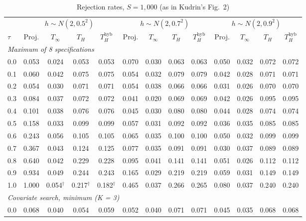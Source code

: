 \begin{table}[htbp]
\centering
\caption{Rejection rates, $S = 1{,}000$ (as in Kudrin's Fig.~2)}
\label{tab:kudrin_style_mean_dial_S1000}
\footnotesize
\setlength{\tabcolsep}{4pt}
\begin{tabular}{lcccccccccccc}
\toprule
 & \multicolumn{4}{c}{$h \sim N(2, 0.5^2)$} & \multicolumn{4}{c}{$h \sim N(2, 0.7^2)$} & \multicolumn{4}{c}{$h \sim N(2, 0.9^2)$} \\
\cmidrule(lr){2-5} \cmidrule(lr){6-9} \cmidrule(lr){10-13}
$\tau$ & Proj. & $T_\infty$ & $T_H$ & $T_H^{\mathrm{hyb}}$ & Proj. & $T_\infty$ & $T_H$ & $T_H^{\mathrm{hyb}}$ & Proj. & $T_\infty$ & $T_H$ & $T_H^{\mathrm{hyb}}$ \\
\midrule
\multicolumn{13}{l}{\textit{Maximum of 8 specifications}} \\
0.0 & 0.053 & 0.024 & 0.053 & 0.053 & 0.070 & 0.030 & 0.063 & 0.063 & 0.050 & 0.032 & 0.072 & 0.072 \\
0.1 & 0.060 & 0.042 & 0.075 & 0.075 & 0.054 & 0.032 & 0.079 & 0.079 & 0.042 & 0.028 & 0.071 & 0.071 \\
0.2 & 0.054 & 0.030 & 0.071 & 0.071 & 0.054 & 0.038 & 0.066 & 0.066 & 0.031 & 0.026 & 0.070 & 0.070 \\
0.3 & 0.084 & 0.037 & 0.072 & 0.072 & 0.041 & 0.020 & 0.069 & 0.069 & 0.042 & 0.026 & 0.095 & 0.095 \\
0.4 & 0.101 & 0.038 & 0.076 & 0.076 & 0.045 & 0.030 & 0.080 & 0.080 & 0.044 & 0.028 & 0.074 & 0.074 \\
0.5 & 0.158 & 0.033 & 0.099 & 0.099 & 0.057 & 0.031 & 0.092 & 0.092 & 0.036 & 0.035 & 0.085 & 0.085 \\
0.6 & 0.243 & 0.056 & 0.105 & 0.105 & 0.065 & 0.035 & 0.100 & 0.100 & 0.050 & 0.032 & 0.099 & 0.099 \\
0.7 & 0.367 & 0.043 & 0.124 & 0.125 & 0.077 & 0.035 & 0.091 & 0.091 & 0.030 & 0.037 & 0.089 & 0.089 \\
0.8 & 0.640 & 0.042 & 0.229 & 0.228 & 0.095 & 0.041 & 0.141 & 0.141 & 0.051 & 0.026 & 0.112 & 0.112 \\
0.9 & 0.934 & 0.049 & 0.244 & 0.243 & 0.165 & 0.029 & 0.219 & 0.219 & 0.059 & 0.031 & 0.149 & 0.149 \\
1.0 & 1.000 & 0.054$^\dagger$ & 0.217$^\dagger$ & 0.182$^\dagger$ & 0.465 & 0.037 & 0.266 & 0.265 & 0.080 & 0.037 & 0.240 & 0.240 \\
\midrule
\multicolumn{13}{l}{\textit{Covariate search, minimum (K = 3)}} \\
0.0 & 0.068 & 0.040 & 0.054 & 0.059 & 0.052 & 0.040 & 0.071 & 0.071 & 0.045 & 0.035 & 0.068 & 0.068 \\

\end{tabular}
\end{table}
